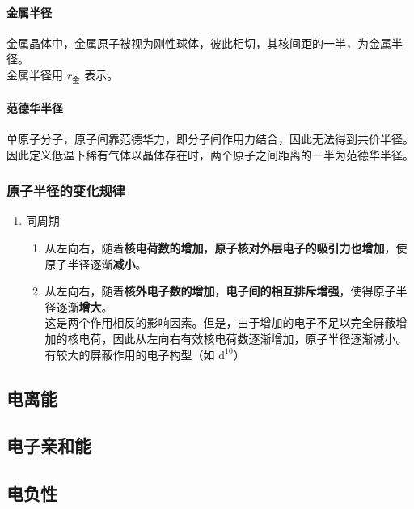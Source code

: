 \paragraph{金属半径}
金属晶体中，金属原子被视为刚性球体，彼此相切，其核间距的一半，为金属半径。\\
金属半径用 $r_{\text{金}}$ 表示。

\paragraph{范德华半径}
单原子分子，原子间靠范德华力，即分子间作用力结合，因此无法得到共价半径。\\
因此定义低温下稀有气体以晶体存在时，两个原子之间距离的一半为范德华半径。

\subsubsection{原子半径的变化规律}
\begin{enumerate}
    \item 同周期
    \begin{enumerate}
        \item 从左向右，随着\textbf{核电荷数的增加}，\textbf{原子核对外层电子的吸引力也增加}，使原子半径逐渐\textbf{减小}。
        \item 从左向右，随着\textbf{核外电子数的增加}，\textbf{电子间的相互排斥增强}，使得原子半径逐渐\textbf{增大}。\\
        这是两个作用相反的影响因素。但是，由于增加的电子不足以完全屏蔽增加的核电荷，因此从左向右有效核电荷数逐渐增加，原子半径逐渐减小。\\
        有较大的屏蔽作用的电子构型（如 $\mathrm{d}^{10}$）
    \end{enumerate}
\end{enumerate}

\subsection{电离能}

\subsection{电子亲和能}

\subsection{电负性}